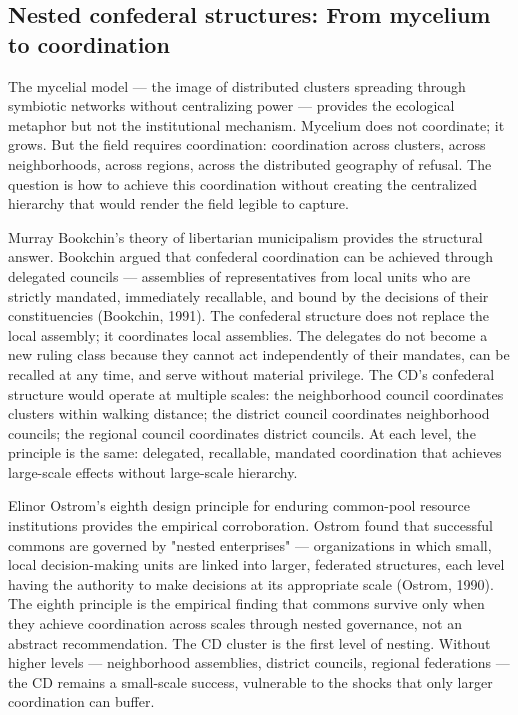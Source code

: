 \subsection{Nested confederal structures: From mycelium to coordination}

The mycelial model — the image of distributed clusters spreading through symbiotic networks without centralizing power — provides the ecological metaphor but not the institutional mechanism. Mycelium does not coordinate; it grows. But the field requires coordination: coordination across clusters, across neighborhoods, across regions, across the distributed geography of refusal. The question is how to achieve this coordination without creating the centralized hierarchy that would render the field legible to capture.

Murray Bookchin's theory of libertarian municipalism provides the structural answer. Bookchin argued that confederal coordination can be achieved through delegated councils — assemblies of representatives from local units who are strictly mandated, immediately recallable, and bound by the decisions of their constituencies (Bookchin, 1991). The confederal structure does not replace the local assembly; it coordinates local assemblies. The delegates do not become a new ruling class because they cannot act independently of their mandates, can be recalled at any time, and serve without material privilege. The CD's confederal structure would operate at multiple scales: the neighborhood council coordinates clusters within walking distance; the district council coordinates neighborhood councils; the regional council coordinates district councils. At each level, the principle is the same: delegated, recallable, mandated coordination that achieves large-scale effects without large-scale hierarchy.

Elinor Ostrom's eighth design principle for enduring common-pool resource institutions provides the empirical corroboration. Ostrom found that successful commons are governed by "nested enterprises" — organizations in which small, local decision-making units are linked into larger, federated structures, each level having the authority to make decisions at its appropriate scale (Ostrom, 1990). The eighth principle is the empirical finding that commons survive only when they achieve coordination across scales through nested governance, not an abstract recommendation. The CD cluster is the first level of nesting. Without higher levels — neighborhood assemblies, district councils, regional federations — the CD remains a small-scale success, vulnerable to the shocks that only larger coordination can buffer.

